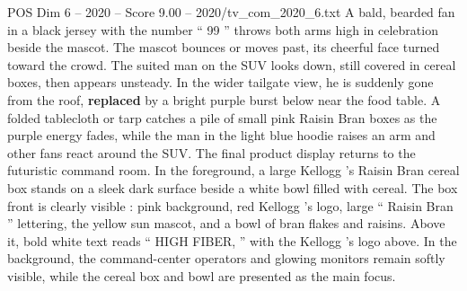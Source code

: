 \begin{textsample}{POS Dim 6 – 2020 – Score 9.00 – 2020/tv\_com\_2020\_6.txt}
A bald, bearded fan in a black jersey with the number “ 99 ” throws both arms high in celebration beside the mascot.
The mascot bounces or moves past, its cheerful face turned toward the crowd.
The suited man on the SUV looks down, still covered in cereal boxes, then appears unsteady.
In the wider tailgate view, he is suddenly gone from the roof, \textbf{replaced} by a bright purple burst below near the food table.
A folded tablecloth or tarp catches a pile of small pink Raisin Bran boxes as the purple energy fades, while the man in the light blue hoodie raises an arm and other fans react around the SUV.
The final product display returns to the futuristic command room.
In the foreground, a large Kellogg ’s Raisin Bran cereal box stands on a sleek dark surface beside a white bowl filled with cereal.
The box front is clearly visible : pink background, red Kellogg ’s logo, large “ Raisin Bran ” lettering, the yellow sun mascot, and a bowl of bran flakes and raisins.
Above it, bold white text reads “ HIGH FIBER, ” with the Kellogg ’s logo above.
In the background, the command-center operators and glowing monitors remain softly visible, while the cereal box and bowl are presented as the main focus.

\end{textsample}
